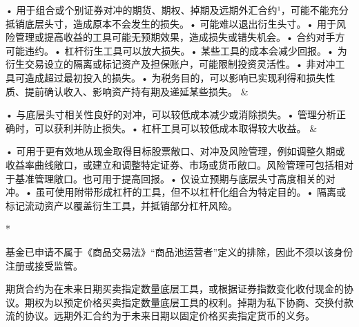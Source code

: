 \documentclass[UTF8,fontset=none,11pt,a4paper]{ctexart}
\begin{document}
\begin{longtable}
\raggedright\arraybackslash • 用于组合或个别证券对冲的期货、期权、掉期及远期外汇合约¹，可能不能充分抵销底层头寸，造成原本不会发生\mbox{的损失。}\newline  • 可能难以退出衍\mbox{生头寸。}\newline  • 用于风险管理或提高收益的工具可能无预期效果，造成损失或错\mbox{失机会。}\newline  • 合约对手方可\mbox{能违约。}\newline  • 杠杆衍生工具可以放\mbox{大损失。}\newline  • 某些工具的成本会减\mbox{少回报。}\newline  • 为衍生交易设立的隔离或标记资产及担保账户，可能限制投资\mbox{灵活性。}\newline  • 非对冲工具可造成超过最初投入\mbox{的损失。}\newline  • 为税务目的，可以影响已实现利得和损失性质、提前确认收入、影响资产持有期及递延某\mbox{些损失。} & \raggedright\arraybackslash • 与底层头寸相关性良好的对冲，可以较低成本减少或消\mbox{除损失。}\newline  • 管理分析正确时，可以获利并防\mbox{止损失。}\newline  • 杠杆工具可以较低成本取得较\mbox{大收益。} & \raggedright\arraybackslash • 可用于更有效地从现金取得目标股票敞口、对冲及风险管理，例如调整久期或收益率曲线敞口，或建立和调整特定证券、市场或货币敞口。风险管理可包括相对于基准管理敞口。也可用于提\mbox{高回报。}\newline  • 仅设立预期与底层头寸高度相关\mbox{的对冲。}\newline  • 虽可使用附带形成杠杆的工具，但不以杠杆化组合为特\mbox{定目的。}\newline  • 隔离或标记流动资产以覆盖衍生工具，并抵销部分杠\mbox{杆风险。} \\
\end{longtable}\endgroup
*

基金已申请不属于《商品交易法》“商品池运营者”定义的排除，因此不须以该身份注册或\allowbreak\mbox{接受监管。}


 期货合约为在未来日期买卖指定数量底层工具，或根据证券指数变化收付现金的协议。期权为以预定价格买卖指定数量底层工具的权利。掉期为私下协商、交换付款流的协议。远期外汇合约为于未来日期以固定价格买卖指定货\allowbreak\mbox{币的义务。}\par\smallskip
\end{document}
